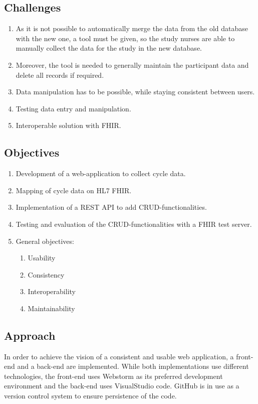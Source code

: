 \documentclass[
a4paper,
11pt
]{article}
\begin{document}
	\subsection{Challenges}
	
	\begin{enumerate}
		\item As it is not possible to automatically merge the data from the old database with the new one, a tool must be given, so the study nurses are able to manually collect the data for the study in the new database.
		\item Moreover, the tool is needed to generally maintain the participant data and delete all records if required.
		\item Data manipulation has to be possible, while staying consistent between users.
		\item Testing data entry and manipulation.
		\item Interoperable solution with \ac{FHIR}.
	\end{enumerate}
	
	\subsection{Objectives}
	
	\begin{enumerate}
		\item Development of a web-application to collect cycle data.
		\item Mapping of cycle data on \ac{HL7} \ac{FHIR}.
		\item Implementation of a \ac{REST} \ac{API} to add \ac{CRUD}-functionalities.
		\item Testing and evaluation of the \ac{CRUD}-functionalities with a \ac{FHIR} test server.
		\item General objectives:
		\begin{enumerate}
			\item Usability
			\item Consistency
			\item Interoperability
			\item Maintainability
		\end{enumerate}
	\end{enumerate}
	
	\subsection{Approach}
	In order to achieve the vision of a consistent and usable web application, a front-end and a back-end are implemented. While both implementations use different technologies, the front-end uses Webstorm as its preferred development environment and the back-end uses VisualStudio code. GitHub is in use as a version control system to ensure persistence of the code\cite{lucaskulla_pmi_2023}.
	\newpage
\end{document}
